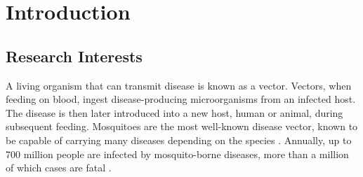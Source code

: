 \section{Introduction}
\label{sec:bg-intro}

    \subsection{Research Interests}
    \label{subsec:bg-intro-resinterests}
        A living organism that can transmit disease is known as a vector. Vectors, when feeding on blood, ingest disease-producing microorganisms from an infected host. The disease is then later introduced into a new host, human or animal, during subsequent feeding. 
        Mosquitoes are the most well-known disease vector, known to be capable of carrying many diseases depending on the species \cite{WHOVectorBorneDisease2016}.
        Annually, up to 700 million people are infected by mosquito-borne diseases, more than a million of which cases are fatal \cite{Caraballo2014}.
        
